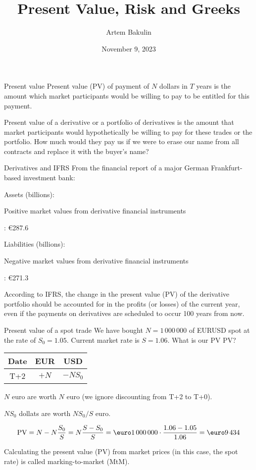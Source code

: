 \documentclass{beamer}
\title{Present Value, Risk and Greeks}
\author{Artem Bakulin}
\date{November 9, 2023}
\renewcommand{\EUR}[1]{\textup{\euro}#1}
\newcommand{\en}[1]{\begin{otherlanguage}{english}#1\end{otherlanguage}}
\begin{document}
\begin{frame}
\titlepage
\end{frame}



\begin{frame}{Present value}
\justify
\alert{Present value (PV)} of payment of $N$ dollars in $T$ years is the amount which market participants would be willing to pay to be entitled for this payment.

\justify
\alert{Present value} of a derivative or a portfolio of derivatives is the amount that market participants would hypothetically be willing to pay for these trades or the portfolio. How much would they pay us if we were to erase our name from all contracts and replace it with the buyer's name?

\end{frame}



\begin{frame}{Derivatives and IFRS}
\justify
From the financial report of a major German Frankfurt-based investment bank:

\justify
Assets (billions):

\en{Positive market values from derivative financial instruments}: \EUR{287.6}

\justify
Liabilities (billions):

\en{Negative market values from derivative financial instruments}: \EUR{271.3}

\justify
According to IFRS, the change in the present value (PV) of the derivative portfolio should be accounted for in the profits (or losses) of the current year, even if the payments on derivatives are scheduled to occur 100 years from now.
\end{frame}



\begin{frame}{Present value of a spot trade}
\justify
We have bought $N=1\,000\,000$ of EURUSD spot at the rate of $S_0 = 1.05$. Current market rate is $S=1.06$. What is our PV PV?

\justify
\centering
\begin{tabular}{c|c|c}
Date & EUR  & USD \\ \hline
T+2 & $+N$ & $-NS_0$
\end{tabular}

\justify
$N$ euro are worth $N$ euro (we ignore discounting from T+2 to T+0).

\justify
$NS_0$ dollats are worth $NS_0/S$ euro.

\begin{align*}
\text{PV} = N - N\frac{S_0}{S} = N\frac{S - S_0}{S} = \EUR{1\,000\,000} \cdot \frac{1.06 - 1.05}{1.06} = \EUR{9\,434}
\end{align*}

\justify
Calculating the present value (PV) from market prices (in this case, the spot rate) is called \alert{marking-to-market (MtM)}.
\end{frame}
\end{document}
